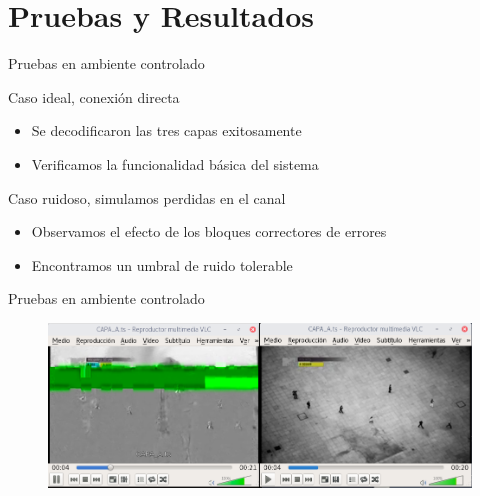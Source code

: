 \section{Pruebas y Resultados}

\begin{frame}{Pruebas en ambiente controlado}
\begin{block}{Caso ideal, conexión directa}
	\begin{itemize}
		\item { Se decodificaron las tres capas exitosamente }
		\item { Verificamos la funcionalidad básica del sistema }
	\end{itemize}
\end{block}

\begin{block}{Caso ruidoso, simulamos perdidas en el canal}
	\begin{itemize}
		\item {	Observamos el efecto de los bloques correctores de errores }
		\item { Encontramos un umbral de ruido tolerable }
	\end{itemize}
\end{block}
\end{frame}

\begin{frame}{Pruebas en ambiente controlado}
	\begin{figure}
		\includegraphics[scale=0.35]{calidad_imagen}
	\end{figure}
\end{frame}

